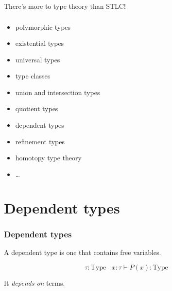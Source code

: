\documentclass[
xcolor={usenames,dvipsnames,svgnames},
]{beamer}
\begin{document}
  \begin{frame}{}
    \begin{center}
      \Large \color{black} There's more to type theory than STLC!
    \end{center}
  \end{frame}

  \begin{frame}
    \frametitle{}
    \begin{itemize}
      \item polymorphic types
      \item existential types
      \item universal types
      \item type classes
      \item union and intersection types
      \item quotient types
      \item dependent types
      \item refinement types
      \item homotopy type theory
      \item \ldots
    \end{itemize}
  \end{frame}

  \section{Dependent types}

  \begin{frame}
    \frametitle{Dependent types}
    A dependent type is one that contains free variables.

    \[
      \tau : \mathrm{Type} \;\;\; x: \tau \vdash P(x) : \mathrm{Type}
    \]

    It \textit{depends on} terms.

  \end{frame}

\end{document}
